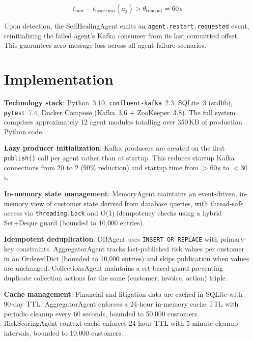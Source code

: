 \documentclass[runningheads]{llncs}
\begin{document}
\begin{equation}
t_{\text{now}} - t_{\text{heartbeat}}(a_j) > \theta_{\text{timeout}} = 60\,\text{s}
\label{eq:heartbeat}
\end{equation}

Upon detection, the SelfHealingAgent emits an \texttt{agent.restart.requested} event, reinitializing the failed agent's Kafka consumer from its last committed offset. This guarantees zero message loss across all agent failure scenarios.

\section{Implementation}
\label{sec:implementation}

\textbf{Technology stack}: Python~3.10, \texttt{confluent-kafka}~2.3, SQLite~3 (stdlib), \texttt{pytest}~7.4, Docker Compose (Kafka~3.6 + ZooKeeper~3.8). The full system comprises approximately 12 agent modules totalling over 350\,KB of production Python code.

\textbf{Lazy producer initialization}: Kafka producers are created on the first \texttt{publish()} call per agent rather than at startup. This reduces startup Kafka connections from 20 to 2 (90\% reduction) and startup time from $>60$\,s to $<30$\,s.

\textbf{In-memory state management}: MemoryAgent maintains an event-driven, in-memory view of customer state derived from database queries, with thread-safe access via \texttt{threading.Lock} and O(1) idempotency checks using a hybrid Set+Deque guard (bounded to 10,000 entries).

\textbf{Idempotent deduplication}: DBAgent uses \texttt{INSERT OR\allowbreak\ REPLACE} with primary-key constraints. AggregatorAgent tracks last-published risk values per customer in an OrderedDict (bounded to 10,000 entries) and skips publication when values are unchanged. CollectionsAgent maintains a set-based guard preventing duplicate collection actions for the same (customer, invoice, action) triple.

\textbf{Cache management}: Financial and litigation data are cached in SQLite with 90-day TTL. AggregatorAgent enforces a 24-hour in-memory cache TTL with periodic cleanup every 60 seconds, bounded to 50,000 customers. RiskScoringAgent context cache enforces 24-hour TTL with 5-minute cleanup intervals, bounded to 10,000 customers.
\end{document}
